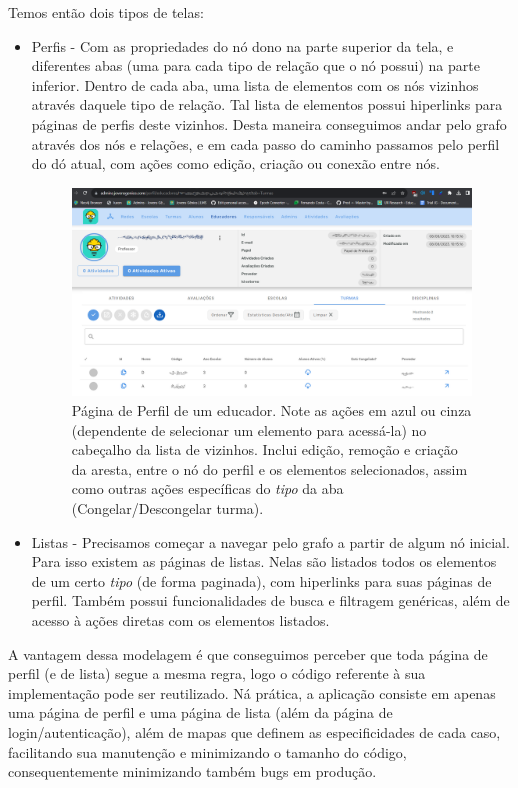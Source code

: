 Temos então dois tipos de telas:
\begin{itemize}
    \item Perfis - Com as propriedades do nó dono na parte superior da tela, e diferentes abas (uma para cada tipo de relação que o nó possui) na parte inferior. Dentro de cada aba, uma lista de elementos com os nós vizinhos através daquele tipo de relação. Tal lista de elementos possui hiperlinks para páginas de perfis deste vizinhos. Desta maneira conseguimos andar pelo grafo através dos nós e relações, e em cada passo do caminho passamos pelo perfil do dó atual, com ações como edição, criação ou conexão entre nós.
        
    \begin{figure}[H]
        \centering
        \includegraphics[width=1.0\linewidth]{Imagens/chap04/perfil-exemplo.png}
        \caption{Página de Perfil de um educador. Note as ações em azul ou cinza (dependente de selecionar um elemento para acessá-la) no cabeçalho da lista de vizinhos. Inclui edição, remoção e criação da aresta, entre o nó do perfil e os elementos selecionados, assim como outras ações específicas do \textit{tipo} da aba (Congelar/Descongelar turma).}
        \label{fig:profile-exemple}
    \end{figure}
    
    \item Listas - Precisamos começar a navegar pelo grafo a partir de algum nó inicial. Para isso existem as páginas de listas. Nelas são listados todos os elementos de um certo \textit{tipo} (de forma paginada), com hiperlinks para suas páginas de perfil. Também possui funcionalidades de busca e filtragem genéricas, além de acesso à ações diretas com os elementos listados.
\end{itemize}

A vantagem dessa modelagem é que conseguimos perceber que toda página de perfil (e de lista) segue a mesma regra, logo o código referente à sua implementação pode ser reutilizado. Ná prática, a aplicação consiste em apenas uma página de perfil e uma página de lista (além da página de login/autenticação), além de mapas que definem as especificidades de cada caso, facilitando sua manutenção e minimizando o tamanho do código, consequentemente minimizando também bugs em produção.

